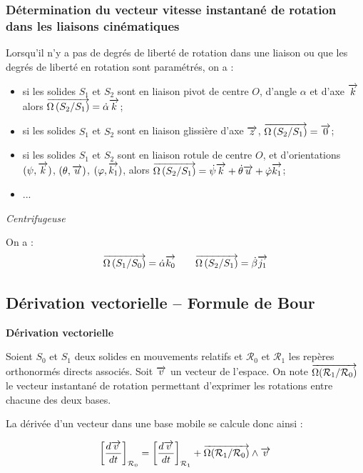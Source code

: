 \documentclass[10pt,oneside]{article}
\begin{document}
\subsubsection{Détermination du vecteur vitesse instantané de rotation dans les liaisons cinématiques}

\begin{resultat}
Lorsqu'il n'y a pas de degrés de liberté de rotation dans une liaison ou que les degrés de liberté en rotation sont paramétrés, on a :  
\begin{itemize}
\item si les solides $S_1$ et $S_2$ sont en liaison pivot de centre $O$, d'angle $\alpha$ et d'axe $\overrightarrow{k}$ alors $\overrightarrow{\Omega\left( {S_2}/{S_1}\right)}=\dot{\alpha}\overrightarrow{k}$;
\item si les solides $S_1$ et $S_2$ sont en liaison glissière d'axe $\overrightarrow{z}$, $\overrightarrow{\Omega\left( {S_2}/{S_1}\right)}=\overrightarrow{0}$; 
\item si les solides $S_1$ et $S_2$ sont en liaison rotule de centre $O$,  et d'orientations $(\psi,\overrightarrow{k})$, $(\theta,\overrightarrow{u})$, $(\varphi,\overrightarrow{k_1})$, alors $\overrightarrow{\Omega\left( {S_2}/{S_1}\right)}=\dot{\psi}\overrightarrow{k}+\dot{\theta}\overrightarrow{u}+\dot{\varphi}\overrightarrow{k_1}$;
\item ...
\end{itemize}
\end{resultat}

\begin{exemple}
\textit{Centrifugeuse}

On a :
$$
\overrightarrow{\Omega\left( {S_1}/{S_0}\right)} = \dot{\alpha}\overrightarrow{k_0} 
\quad \quad
\overrightarrow{\Omega\left( {S_2}/{S_1}\right)} = \dot{\beta}\overrightarrow{j_1} 
$$

\end{exemple}
\subsection{Dérivation vectorielle -- Formule de Bour}


\begin{resultat}
\textbf{Dérivation vectorielle}

Soient $S_0$ et $S_1$ deux solides en mouvements relatifs et $\mathcal{R}_0$ et $\mathcal{R}_1$ les repères orthonormés directs associés. Soit $\overrightarrow{v}$ un vecteur de l'espace. On note $\overrightarrow{\Omega(\mathcal{R}_1/\mathcal{R}_0)}$ le vecteur instantané de rotation permettant d'exprimer les rotations entre chacune des deux bases. 

La dérivée d'un vecteur dans une base mobile se calcule donc ainsi :

$$
\left[\dfrac{d\overrightarrow{v}}{dt}\right]_{\mathcal{R}_0} =
\left[\dfrac{d\overrightarrow{v}}{dt}\right]_{\mathcal{R}_1} 
+ \overrightarrow{\Omega(\mathcal{R}_1/\mathcal{R}_0)}\wedge \overrightarrow{v}
$$
\end{resultat}
\end{document}
